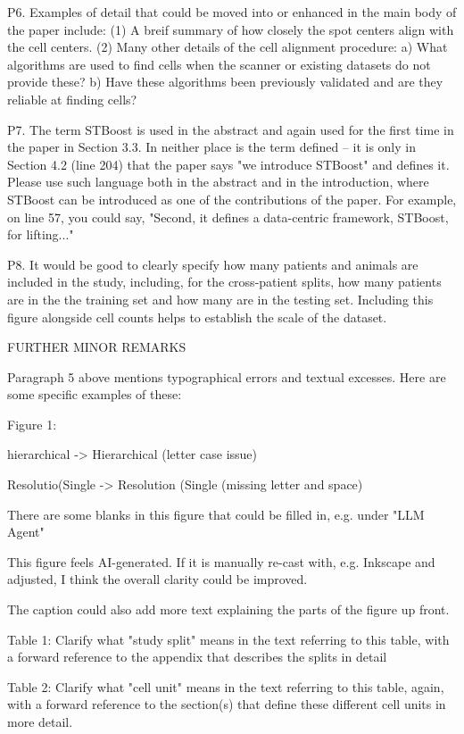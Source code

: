 P6. Examples of detail that could be moved into or enhanced in the main body of the paper include: (1) A breif summary of how closely the spot centers align with the cell centers. (2) Many other details of the cell alignment procedure: a) What algorithms are used to find cells when the scanner or existing datasets do not provide these? b) Have these algorithms been previously validated and are they reliable at finding cells?

P7. The term STBoost is used in the abstract and again used for the first time in the paper in Section 3.3. In neither place is the term defined -- it is only in Section 4.2 (line 204) that the paper says "we introduce STBoost" and defines it. Please use such language both in the abstract and in the introduction, where STBoost can be introduced as one of the contributions of the paper. For example, on line 57, you could say, "Second, it defines a data-centric framework, STBoost, for lifting..."

P8. It would be good to clearly specify how many patients and animals are included in the study, including, for the cross-patient splits, how many patients are in the the training set and how many are in the testing set. Including this figure alongside cell counts helps to establish the scale of the dataset.

FURTHER MINOR REMARKS

Paragraph 5 above mentions typographical errors and textual excesses. Here are some specific examples of these:

Figure 1:

hierarchical -> Hierarchical (letter case issue)

Resolutio(Single -> Resolution (Single (missing letter and space)

There are some blanks in this figure that could be filled in, e.g. under "LLM Agent"

This figure feels AI-generated. If it is manually re-cast with, e.g. Inkscape and adjusted, I think the overall clarity could be improved.

The caption could also add more text explaining the parts of the figure up front.

Table 1: Clarify what "study split" means in the text referring to this table, with a forward reference to the appendix that describes the splits in detail

Table 2: Clarify what "cell unit" means in the text referring to this table, again, with a forward reference to the section(s) that define these different cell units in more detail.

